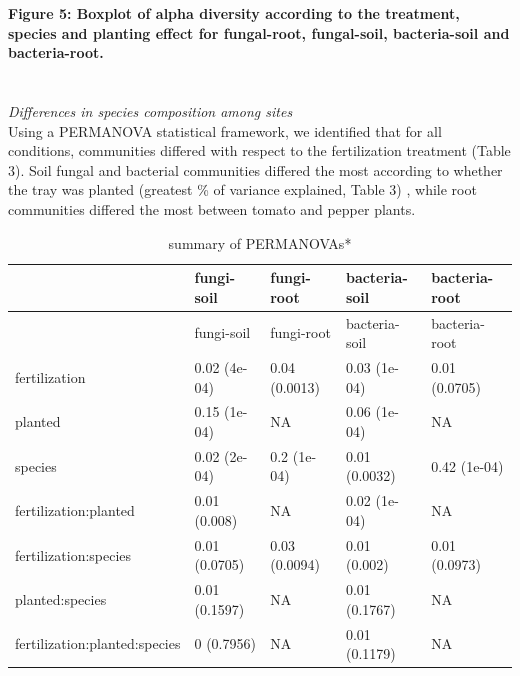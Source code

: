 \documentclass[11pt,]{article}
\begin{document}
\textbf{Figure 5: Boxplot of alpha diversity according to the treatment,
species and planting effect for fungal-root, fungal-soil, bacteria-soil
and bacteria-root.}\\
\hspace*{0.333em}\\
\hspace*{0.333em}\\
\emph{Differences in species composition among sites}\\
Using a PERMANOVA statistical framework, we identified that for all
conditions, communities differed with respect to the fertilization
treatment (Table 3). Soil fungal and bacterial communities differed the
most according to whether the tray was planted (greatest \% of variance
explained, Table 3) , while root communities differed the most between
tomato and pepper plants.

\begin{longtable}[]{@{}lllll@{}}
\caption{summary of PERMANOVAs*}\tabularnewline
\toprule
& fungi-soil & fungi-root & bacteria-soil & bacteria-root\tabularnewline
\midrule
\endfirsthead
\toprule
& fungi-soil & fungi-root & bacteria-soil & bacteria-root\tabularnewline
\midrule
\endhead
fertilization & 0.02 (4e-04) & 0.04 (0.0013) & 0.03 (1e-04) & 0.01
(0.0705)\tabularnewline
planted & 0.15 (1e-04) & NA & 0.06 (1e-04) & NA\tabularnewline
species & 0.02 (2e-04) & 0.2 (1e-04) & 0.01 (0.0032) & 0.42
(1e-04)\tabularnewline
fertilization:planted & 0.01 (0.008) & NA & 0.02 (1e-04) &
NA\tabularnewline
fertilization:species & 0.01 (0.0705) & 0.03 (0.0094) & 0.01 (0.002) &
0.01 (0.0973)\tabularnewline
planted:species & 0.01 (0.1597) & NA & 0.01 (0.1767) & NA\tabularnewline
fertilization:planted:species & 0 (0.7956) & NA & 0.01 (0.1179) &
NA\tabularnewline
\bottomrule
\end{longtable}
\end{document}
